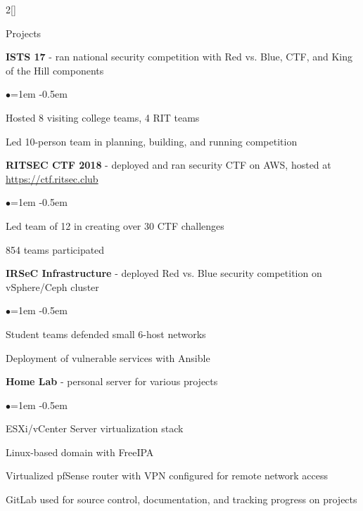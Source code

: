 \documentclass[8pt]{resume} %
\begin{document}
\begin{multicols}{2}[]


\begin{rSection}{Projects}

    {\bf ISTS 17} - ran national security competition with Red vs. Blue, CTF,
        and King of the Hill components
    \begin{list}{$\bullet$}{\leftmargin=1em}
    \itemsep -0.5em \vspace{-0.5em}
        \item Hosted 8 visiting college teams, 4 RIT teams
        \item Led 10-person team in planning, building, and running competition
    \end{list}


    {\bf RITSEC CTF 2018} - deployed and ran security CTF on AWS, hosted at
    \url{https://ctf.ritsec.club}
    \begin{list}{$\bullet$}{\leftmargin=1em}
    \itemsep -0.5em \vspace{-0.5em}
        \item Led team of 12 in creating over 30 CTF challenges
        \item 854 teams participated
    \end{list}


    {\bf IRSeC Infrastructure} - deployed Red vs. Blue security competition on
    vSphere/Ceph cluster
    \begin{list}{$\bullet$}{\leftmargin=1em}
    \itemsep -0.5em \vspace{-0.5em}
        \item Student teams defended small 6-host networks
        \item Deployment of vulnerable services with Ansible
    \end{list}


    {\bf Home Lab} - personal server for various projects
    \begin{list}{$\bullet$}{\leftmargin=1em}
    \itemsep -0.5em \vspace{-0.5em}
        \item ESXi/vCenter Server virtualization stack
        \item Linux-based domain with FreeIPA
        \item Virtualized pfSense router with VPN configured for remote network
            access
        \item GitLab used for source control, documentation, and tracking
            progress on projects
    \end{list}


\end{rSection}
\end{multicols}
\end{document}
